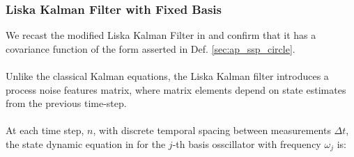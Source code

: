\subsubsection{Liska Kalman Filter with Fixed Basis} \label{sec:ap_approxSP:LKFFB}
We recast the modified Liska Kalman Filter in \cite{liska} and confirm that it has a covariance function of the form asserted in Def. \ref{sec:ap_ssp_circle}. 
\\
\\
Unlike the classical Kalman equations, the Liska Kalman filter introduces a process noise features matrix, where matrix elements depend on state estimates from the previous time-step. 
\\
\\
At each time step, $n$, with discrete temporal spacing between measurements $\Delta t$, the state dynamic equation in \cite{liska} for the $j$-th basis osscillator with frequency $\omega_j$ is:
